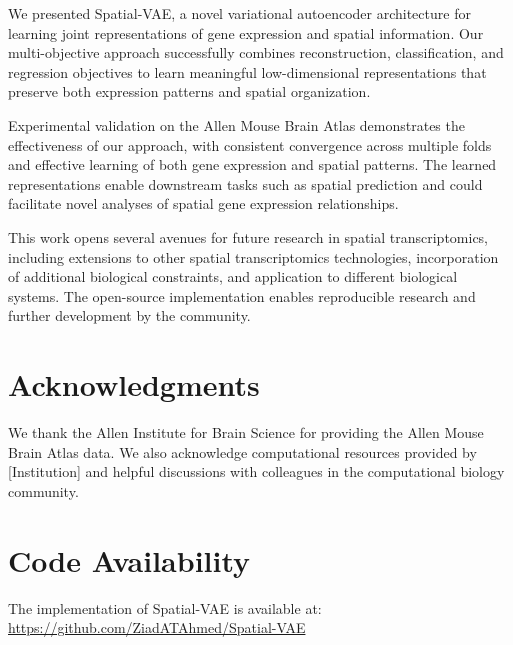 \documentclass[11pt]{article}
\begin{document}
We presented Spatial-VAE, a novel variational autoencoder architecture for learning joint representations of gene expression and spatial information. Our multi-objective approach successfully combines reconstruction, classification, and regression objectives to learn meaningful low-dimensional representations that preserve both expression patterns and spatial organization.

Experimental validation on the Allen Mouse Brain Atlas demonstrates the effectiveness of our approach, with consistent convergence across multiple folds and effective learning of both gene expression and spatial patterns. The learned representations enable downstream tasks such as spatial prediction and could facilitate novel analyses of spatial gene expression relationships.

This work opens several avenues for future research in spatial transcriptomics, including extensions to other spatial transcriptomics technologies, incorporation of additional biological constraints, and application to different biological systems. The open-source implementation enables reproducible research and further development by the community.

\section*{Acknowledgments}

We thank the Allen Institute for Brain Science for providing the Allen Mouse Brain Atlas data. We also acknowledge computational resources provided by [Institution] and helpful discussions with colleagues in the computational biology community.

\section*{Code Availability}

The implementation of Spatial-VAE is available at: \url{https://github.com/ZiadATAhmed/Spatial-VAE}



\end{document}
